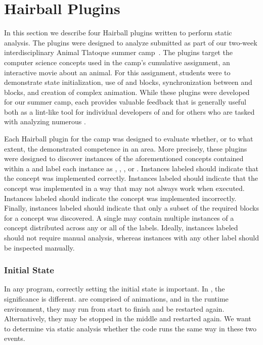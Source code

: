\section{Hairball Plugins} 
In this section we describe four Hairball plugins written to perform
\sprogram{} static analysis.  The plugins were designed to analyze 
submitted as part of our two-week interdisciplinary Animal Tlatoque summer
camp~\cite{Franklin:2013:SBO}. The plugins target the computer science concepts
used in the camp's cumulative assignment, an interactive movie about an
animal. For this assignment, students were to demonstrate state initialization,
use of \broadcast{} and \receive{} blocks, synchronization between \say{} and
\playsound{} blocks, and creation of complex animation. While these plugins
were developed for our summer camp, each provides valuable feedback that is
generally useful both as a lint-like tool for individual developers of
 and for others who are tasked with analyzing numerous
.

Each Hairball plugin for the camp was designed to evaluate whether, or to what
extent, the \sprogram{} demonstrated competence in an area. More precisely,
these plugins were designed to discover instances of the aforementioned
concepts contained within a \sprogram{} and label each instance as \correct{},
\semincor{}, \incor{}, or \incom{}. Instances labeled \correct{} should
indicate that the concept was implemented correctly. Instances labeled
\semincor{} should indicate that the concept was implemented in a way that may
not always work when executed. Instances labeled \incor{} should indicate the
concept was implemented incorrectly. Finally, instances labeled \incom{} should
indicate that only a subset of the required blocks for a concept was
discovered. A single \sprogram{} may contain multiple instances of a concept
distributed across any or all of the labels. Ideally, instances labeled
\correct{} should not require manual analysis, whereas instances with any other
label should be inspected manually.


\subsubsection{Initial State}
In any program, correctly setting the initial state is important.  In
, the significance is different.   are comprised of
animations, and in the runtime environment, they may run from start to finish
and be restarted again.  Alternatively, they may be stopped in the middle and
restarted again.  We want to determine via static analysis whether the code
runs the same way in these two events.

